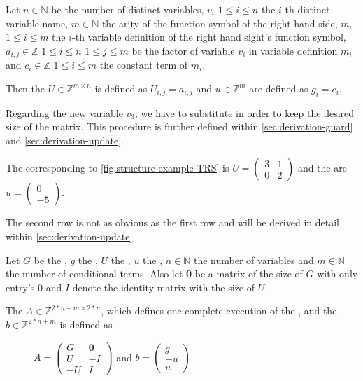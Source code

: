 \begin{definition}
	\label{def:update}
	Let $n \in \mathbb{N}$ be the number of distinct variables, $v_i$ $1 \le i \le n$ the $i$-th distinct		variable name, $m \in \mathbb{N}$ the arity of the function symbol of the right hand side, $m_i$ $1 \le i \le m$ the $i$-th variable definition of the right hand sight's function symbol, $a_{i,j} \in \mathbb{Z}$ $1 \le i \le n$ $1 \le j \le m$ be the factor of variable $v_i$ in variable definition $m_i$ and $c_i \in \mathbb{Z}$ $1 \le i \le m$ the constant term of $m_i$. \newline
	
	Then the \updatematrix $U \in \mathbb{Z}^{m \times n}$ is defined as $U_{i,j}=a_{i,j}$ and \updateconstants $u \in \mathbb{Z}^m$ are defined as $g_i = c_i$.
	
	Regarding the new variable $v_3$, we have to substitute in order to keep the desired size of the matrix. This procedure is further defined within \autoref{sec:derivation-guard} and \autoref{sec:derivation-update}.
\end{definition}
\begin{example}
	The corresponding \updatematrix to \autoref{fig:structure-example-TRS} is $U = \begin{pmatrix} 3 & 1 \\ 0 & 2 \end{pmatrix}$ and the \updateconstants are $u = \begin{pmatrix} 0 \\ -5 \end{pmatrix}$.
	
	The second row is not as obvious as the first row and will be derived in detail within \autoref{sec:derivation-update}.
\end{example}

\begin{definition}
	\label{def:iteration}
	Let $G$ be the \guardmatrix, $g$ the \guardconstants, $U$ the \updatematrix, $u$ the \updateconstants, $n\in \mathbb{N}$ the number of variables and $m \in \mathbb{N}$ the number of conditional terms. \newline
	Also let \textbf{0} be a matrix of the size of $G$ with only entry's 0 and $I$ denote the identity matrix with the size of $U$. \newline
	
	The \iterationmatrix $A \in \mathbb{Z}^{2*n+m \times 2*n}$, which defines one complete execution of the \loopt, and the \iterationconstants $b\in \mathbb{Z}^{2*n+m} $ is defined as
	\begin{figure}[H]
		\centering
		$A = \begin{pmatrix} G & \textbf{0} \\ U & -I \\ -U & I \end{pmatrix}$ and $b = \begin{pmatrix} g \\ -u \\ u \end{pmatrix}$ \cite{leike2014geometric}
	\end{figure}	
\end{definition}

